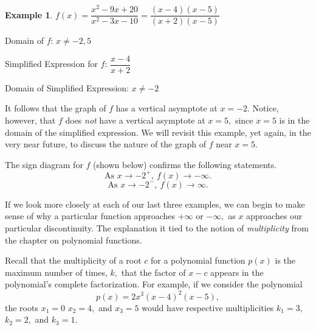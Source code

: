 \documentclass[12pt]{book}
\theoremstyle{definition}
\newtheorem{example}{Example}
\begin{document}
\begin{example}\label{vert_asym_3}
$f(x)=\dfrac{x^2-9x+20}{x^2-3x-10}=\dfrac{(x-4)(x-5)}{(x+2)(x-5)}$
\par
Domain of $f$: $x\neq -2,5$
\par
Simplified Expression for $f$: $\dfrac{x-4}{x+2}$
\par
Domain of Simplified Expression: $x\neq -2$
\par
It follows that the graph of $f$ has a vertical asymptote at $x=-2$.  Notice, however, that $f$ does {\it not} have a vertical asymptote at $x=5,$ since $x=5$ is in the domain of the simplified expression.  We will revisit this example, yet again, in the very near future, to discuss the nature of the graph of $f$ near $x=5$.
\par
The sign diagram for $f$ (shown below) confirms the following statements.
$$\text{As }x\rightarrow -2^+, \ f(x)\rightarrow -\infty.$$
$$\text{As }x\rightarrow -2^-, \ f(x)\rightarrow \infty.$$
\begin{center}
\end{center}
\end{example}
If we look more closely at each of our last three examples, we can begin to make sense of why a particular function approaches $+\infty$ or $-\infty,$ as $x$ approaches our particular discontinuity.  The explanation it tied to the notion of {\it multiplicity} from the chapter on polynomial functions.
\par
Recall that the multiplicity of a root $c$ for a polynomial function $p(x)$ is the maximum number of times, $k,$ that the factor of $x-c$ appears in the polynomial's complete factorization.  For example, if we consider the polynomial
$$p(x)=2x^3(x-4)^2(x-5),$$
the roots $x_1=0$ $x_2=4,$ and $x_3=5$ would have respective multiplicities $k_1=3,$ $k_2=2,$ and $k_3=1$.
\par
\end{document}
